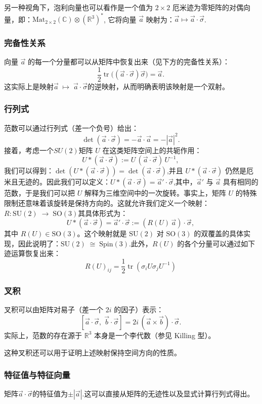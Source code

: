 另一种视角下，泡利向量也可以看作是一个值为 $2\times 2$ 厄米迹为零矩阵的对偶向量，即：$\text{Mat}_{2\times 2}(\mathbb{C}) \otimes (\mathbb{R}^3)^*$,
它将向量 $\vec{a}$ 映射为：$\vec{a} \mapsto \vec{a} \cdot \vec{\sigma}$.
\subsubsection{完备性关系}
向量 $\vec{a}$ 的每一个分量都可以从矩阵中恢复出来（见下方的完备性关系）：
$$
\frac{1}{2} \operatorname{tr} \bigl( (\vec{a} \cdot \vec{\sigma}) \vec{\sigma} \bigr) = \vec{a}.~
$$
这实际上是映射$\vec{a} \;\mapsto\; \vec{a} \cdot \vec{\sigma}$的逆映射，从而明确表明该映射是一个双射。
\subsubsection{行列式}
范数可以通过行列式（差一个负号）给出：
$$
\det(\vec{a} \cdot \vec{\sigma}) = -\vec{a} \cdot \vec{a} = -|\vec{a}|^2.~
$$
接着，考虑一个$SU(2)$矩阵 $U$ 在这类矩阵空间上的共轭作用：
$$
U * (\vec{a} \cdot \vec{\sigma}) := U\,(\vec{a} \cdot \vec{\sigma})\,U^{-1},~
$$
我们可以得到：$\det(U * (\vec{a} \cdot \vec{\sigma})) = \det(\vec{a} \cdot \vec{\sigma})$,并且 $U * (\vec{a} \cdot \vec{\sigma})$ 仍然是厄米且无迹的。因此我们可以定义：$U * (\vec{a} \cdot \vec{\sigma}) = \vec{a}' \cdot \vec{\sigma}$,其中，$\vec{a}'$ 与 $\vec{a}$ 具有相同的范数，于是我们可以把 $U$ 解释为三维空间中的一次旋转。事实上，矩阵 $U$ 的特殊限制还意味着该旋转是保持方向的。这就允许我们定义一个映射：$R: \mathrm{SU}(2) \;\longrightarrow\; \mathrm{SO}(3)$其具体形式为：
$$
U * (\vec{a} \cdot \vec{\sigma}) = \vec{a}' \cdot \vec{\sigma} := (R(U)\,\vec{a}) \cdot \vec{\sigma},~
$$
其中 $R(U) \in \mathrm{SO}(3)$。这个映射就是 $\mathrm{SU}(2)$ 对 $\mathrm{SO}(3)$ 的双覆盖的具体实现，因此说明了：$\mathrm{SU}(2) \;\cong\; \mathrm{Spin}(3)$.此外，$R(U)$ 的各个分量可以通过如下迹运算恢复出来：
$$
R(U)_{ij} = \frac{1}{2} \operatorname{tr}(\sigma_i U \sigma_j U^{-1})~
$$
\subsubsection{叉积}
叉积可以由矩阵对易子（差一个 $2i$ 的因子）表示：
$$
[\vec{a} \cdot \vec{\sigma},\; \vec{b} \cdot \vec{\sigma}] = 2i\,(\vec{a} \times \vec{b}) \cdot \vec{\sigma}.~
$$
实际上，范数的存在源于 $\mathbb{R}^3$ 本身是一个李代数（参见 Killing 型）。

这种叉积还可以用于证明上述映射保持空间方向的性质。
\subsubsection{特征值与特征向量}
矩阵$\vec{a} \cdot \vec{\sigma}$的特征值为$\pm |\vec{a}|$.这可以直接从矩阵的无迹性以及显式计算行列式得出。

